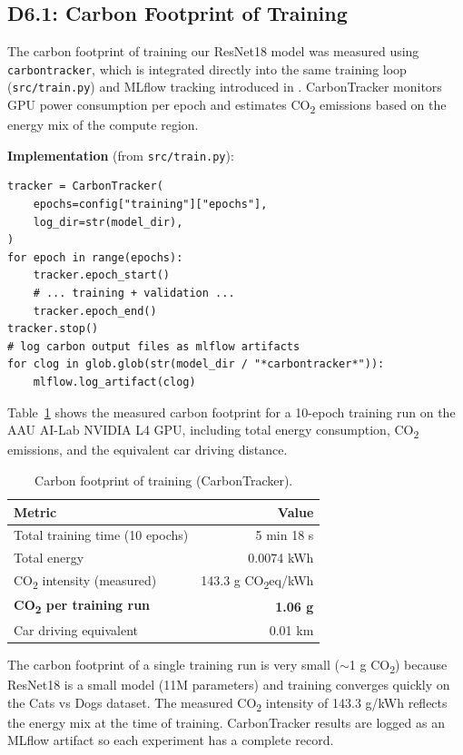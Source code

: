 \documentclass[10pt,twocolumn,letterpaper]{article}
\begin{document}
\subsection{D6.1: Carbon Footprint of Training}

The carbon footprint of training our ResNet18 model was measured using \texttt{carbontracker}, which is integrated directly into the same training loop (\texttt{src/train.py}) and MLflow tracking introduced in . CarbonTracker monitors GPU power consumption per epoch and estimates CO\textsubscript{2} emissions based on the energy mix of the compute region.

\textbf{Implementation} (from \texttt{src/train.py}):
\begin{verbatim}
tracker = CarbonTracker(
    epochs=config["training"]["epochs"],
    log_dir=str(model_dir),
)
for epoch in range(epochs):
    tracker.epoch_start()
    # ... training + validation ...
    tracker.epoch_end()
tracker.stop()
# log carbon output files as mlflow artifacts
for clog in glob.glob(str(model_dir / "*carbontracker*")):
    mlflow.log_artifact(clog)
\end{verbatim}

Table~\ref{tab:carbon} shows the measured carbon footprint for a 10-epoch training run on the AAU AI-Lab NVIDIA L4 GPU, including total energy consumption, CO\textsubscript{2} emissions, and the equivalent car driving distance.

\begin{table}[h]
\centering
\caption{Carbon footprint of training (CarbonTracker).}
\label{tab:carbon}
\begin{tabular}{@{} l r @{}}
\toprule
\textbf{Metric} & \textbf{Value} \\
\midrule
Total training time (10 epochs) & 5 min 18 s \\
Total energy & 0.0074 kWh \\
CO\textsubscript{2} intensity (measured) & 143.3 g CO\textsubscript{2}eq/kWh \\
\textbf{CO\textsubscript{2} per training run} & \textbf{1.06 g} \\
Car driving equivalent & 0.01 km \\
\bottomrule
\end{tabular}
\end{table}

The carbon footprint of a single training run is very small ($\sim$1 g CO\textsubscript{2}) because ResNet18 is a small model (11M parameters) and training converges quickly on the Cats vs Dogs dataset. The measured CO\textsubscript{2} intensity of 143.3 g/kWh reflects the energy mix at the time of training. CarbonTracker results are logged as an MLflow artifact so each experiment has a complete record.
\end{document}

